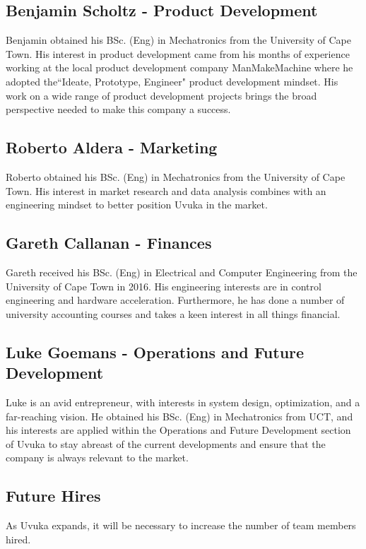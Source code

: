\subsection{Benjamin Scholtz - Product Development}
Benjamin obtained his BSc. (Eng) in Mechatronics from the University of Cape Town. His interest in product development came from his months of experience working at the local product development company ManMakeMachine where he adopted the``Ideate, Prototype, Engineer" product development mindset. His work on a wide range of product development projects brings the broad perspective needed to make this company a success.  

\subsection{Roberto Aldera - Marketing}
Roberto obtained his BSc. (Eng) in Mechatronics from the University of Cape Town. His interest in market research and data analysis combines with an engineering mindset to better position Uvuka in the market.

\subsection{Gareth Callanan - Finances}
Gareth received his BSc. (Eng) in Electrical and Computer Engineering from the University of Cape Town in 2016. His engineering interests are in control engineering and hardware acceleration. Furthermore, he has done a number of university accounting courses and takes a keen interest in all things financial. 

\subsection{Luke Goemans - Operations and Future Development}
Luke is an avid entrepreneur, with interests in system design, optimization, and a far-reaching vision. He obtained his BSc. (Eng) in Mechatronics from UCT, and his interests are applied within the Operations and Future Development section of Uvuka to stay abreast of the current developments and ensure that the company is always relevant to the market.

\subsection{Future Hires}
As Uvuka expands, it will be necessary to increase the number of team members hired. 

